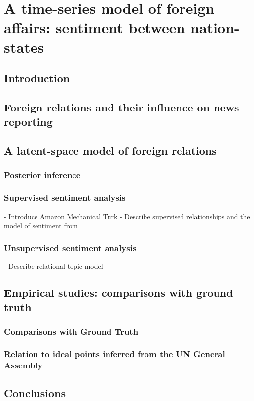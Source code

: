 \chapter{A time-series model of foreign affairs: sentiment between nation-states}

\section*{Introduction}

\section{Foreign relations and their influence on news reporting}

\section{A latent-space model of foreign relations}

\subsection{Posterior inference}

\subsection{Supervised sentiment analysis}

  - Introduce Amazon Mechanical Turk
  - Describe supervised relationships and the model of sentiment from 

\subsection{Unsupervised sentiment analysis}

 - Describe relational topic model

\section{Empirical studies: comparisons with ground truth}

\subsection{Comparisons with Ground Truth}

\subsection{Relation to ideal points inferred from the UN General Assembly}

\section*{Conclusions}
